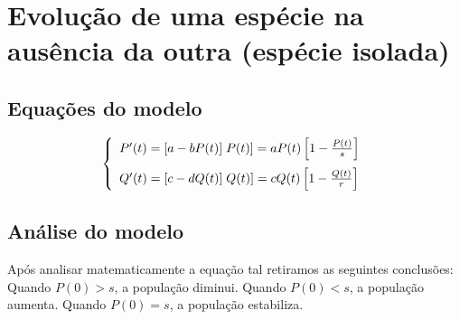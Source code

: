 


\section{Evolução de uma espécie na ausência da outra (espécie isolada)}
\subsection{Equações do modelo}
\begin{equation}
\left\{
\begin{array}{l}
P'(t)=[a-bP(t)]\;P(t)]=aP(t)\left[1-\frac{P(t)}{s}\right]  \medskip  \\
Q'(t)=[c-dQ(t)]\;Q(t)]=cQ(t)\left[1-\frac{Q(t)}{r}\right]
\end{array}
\right.
\end{equation}



\subsection{Análise do modelo}
\noindent
Após analisar matematicamente a equação tal retiramos as seguintes conclusões:\smallskip\newline
Quando  $P(0)>s$, a população diminui.\newline
Quando  $P(0)<s$, a população aumenta.\newline
Quando  $P(0)=s$, a população estabiliza.




